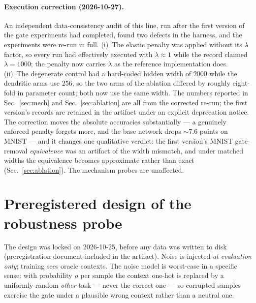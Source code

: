 \documentclass[review,12pt,number]{elsarticle}
\begin{document}
\paragraph{Execution correction (2026-10-27).}
An independent data-consistency audit of this line, run after the first
version of the gate experiments had completed, found two defects in the
harness, and the experiments were re-run in full. (i)~The elastic penalty
was applied without its $\lambda$ factor, so every run had effectively
executed with $\lambda \approx 1$ while the record claimed
$\lambda{=}1000$; the penalty now carries $\lambda$ as the reference
implementation does. (ii)~The degenerate control had a hard-coded hidden
width of $2000$ while the dendritic arms use $256$, so the two arms of the
ablation differed by roughly eight-fold in parameter count; both now use
the same width. The numbers reported in Sec.~\ref{sec:mech} and
Sec.~\ref{sec:ablation} are all from the corrected re-run; the first
version's records are retained in the artifact under an explicit
deprecation notice. The correction moves the absolute accuracies
substantially --- a genuinely enforced penalty forgets more, and the base
network drops ${\sim}7.6$ points on MNIST --- and it changes one qualitative
verdict: the first version's MNIST gate-removal \emph{equivalence} was an
artifact of the width mismatch, and under matched widths the equivalence
becomes approximate rather than exact (Sec.~\ref{sec:ablation}). The
mechanism probes are unaffected.


\section{Preregistered design of the robustness probe}
\label{sec:design}

The design was locked on 2026-10-25, before any data was written to disk
(preregistration document included in the artifact). Noise is injected
\emph{at evaluation only}; training sees oracle contexts. The noise model
is worst-case in a specific sense: with probability $\rho$ per sample the
context one-hot is replaced by a uniformly random \emph{other} task ---
never the correct one --- so corrupted samples exercise the gate under a
plausible wrong context rather than a neutral one.
\end{document}
